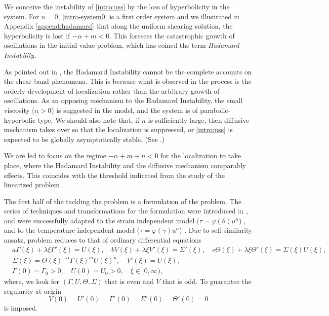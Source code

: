 \documentclass[a4paper,11pt]{article}
\begin{document}
We conceive the instability of \eqref{intro:uss} by the loss of hyperbolicity in the system. For $n=0$, \eqref{intro-system0} is a first order system and we illustrated in Appendix \ref{append:hadamard} that along the uniform shearing solution, the hyperbolicity is lost if $-\alpha+m<0$. This foresees the catastrophic growth of oscillations in the initial value problem, which has coined the term {\it Hadamard Instability}.

As pointed out in \cite{KOT14}, the Hadamard Instability cannot be the complete accounts on the shear band phenomena. This is because what is observed in the process is the orderly development of localization \cite{zener_effect_1944} rather than the arbitrary growth of oscillations. As an opposing mechanism to the Hadamard Instability, the small viscosity ($n>0$) is suggested in the model, and the system is of parabolic-hyperbolic type. We should also note that, if $n$ is sufficiently large, then diffusive mechanism takes over so that the localization is suppressed, or \eqref{intro:uss} is expected to be globally asymptotically stable. (See \cite{DH_1983, Tz_1986, tzavaras_strain_1991}.)

We are led to focus on the regime $-\alpha+m+n<0$ for the localization to take place, where the Hadamard Instability and the diffusive mechanism comparably effects. This coincides with the threshold indicated from the study of the linearized problem \cite{FM87}. 

The first half of the tackling the problem is a formulation of the problem. The series of techniques and transformations for the formulation were introduced in \cite{KOT14}, and were successfully adapted to the strain independent model ($\tau=\varphi(\theta)u^n$) \cite{KLT_HYP2016}, and to the temperature independent model ($\tau=\varphi(\gamma)u^n$) \cite{LT16,KLT_2016}. Due to self-similarity ansatz, problem reduces to that of ordinary differential equations
\begin{equation} \label{intro:ss-odes}
\begin{aligned}
 &a \Gamma(\xi) + \lambda \xi \Gamma'(\xi) = U(\xi), \quad
 b V(\xi) + \lambda \xi V'(\xi) = \Sigma'(\xi), \quad c \Theta(\xi) + \lambda \xi \Theta'(\xi)=\Sigma(\xi) U(\xi),\\
 &\Sigma(\xi) = \Theta(\xi)^{-\alpha} \Gamma(\xi)^m U(\xi)^n, \quad V'(\xi)=U(\xi),\\
 &\Gamma(0)=\Gamma_0>0, \quad U(0)=U_0>0, \quad \text{$\xi \in [0,\infty)$},
\end{aligned} 
\end{equation}
where, we look for $(\Gamma,U,\Theta,\Sigma)$ that is even and $V$ that is odd. To guarantee the regularity at origin
\begin{equation}
 V(0)=U'(0)=\Gamma'(0)=\Sigma'(0)=\Theta'(0)=0 \label{intro:bdry0}
\end{equation}
is imposed.
\end{document}
